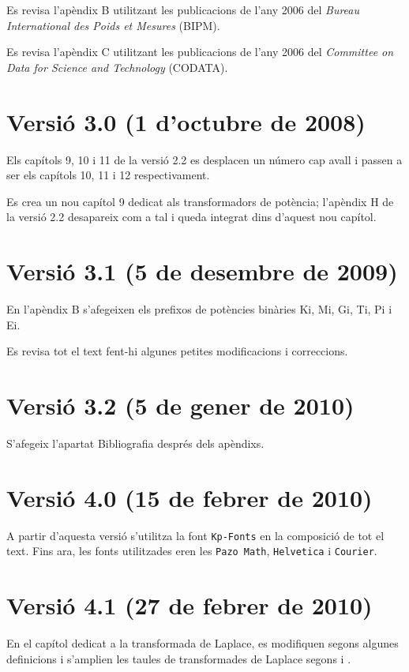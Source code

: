 Es revisa l'apèndix B utilitzant les publicacions de l'any 2006 del \textit{Bureau
International des Poids et Mesures} (BIPM).

Es revisa l'apèndix C utilitzant les publicacions de l'any 2006 del \textit{Committee on Data for Science and Technology} (CODATA).

\section*{Versió 3.0 (1 d'octubre de 2008)}

Els capítols 9, 10 i 11 de la versió 2.2 es desplacen un número cap
avall i passen a ser els capítols 10, 11 i 12 respectivament.

Es crea un nou capítol 9 dedicat als transformadors de potència;
l'apèndix H de la versió 2.2 desapareix com a tal i queda integrat
dins d'aquest nou capítol.


\section*{Versió 3.1 (5 de desembre de 2009)}
En l'apèndix B s'afegeixen els prefixos de potències binàries Ki, Mi, Gi, Ti, Pi i Ei.

Es revisa tot el text fent-hi algunes petites modificacions i
correccions.

\section*{Versió 3.2 (5 de gener de 2010)}
S'afegeix l'apartat Bibliografia després dels apèndixs.


\section*{Versió 4.0 (15 de febrer de 2010)}
A partir d'aquesta versió s'utilitza la font \texttt{Kp-Fonts} en la composició de tot el text. Fins ara, les fonts utilitzades eren les \texttt{Pazo Math}, \texttt{Helvetica} i \texttt{Courier}.


\section*{Versió 4.1 (27 de febrer de 2010)}
En el capítol dedicat a la transformada de Laplace, es modifiquen segons \cite{SCH} algunes definicions  i s'amplien les taules de transformades de Laplace segons \cite{SCH} i \cite{RASd}.

